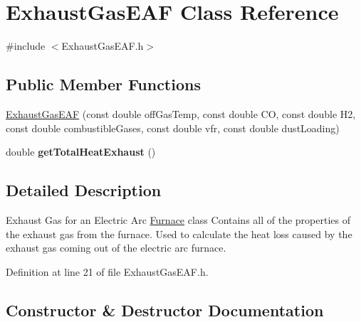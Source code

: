 \hypertarget{class_exhaust_gas_e_a_f}{}\section{Exhaust\+Gas\+E\+AF Class Reference}
\label{class_exhaust_gas_e_a_f}


{\ttfamily \#include $<$Exhaust\+Gas\+E\+A\+F.\+h$>$}

\subsection*{Public Member Functions}
\begin{DoxyCompactItemize}
\item 
\hyperlink{class_exhaust_gas_e_a_f_a500eba1e0016803cb94485594354f36a}{Exhaust\+Gas\+E\+AF} (const double off\+Gas\+Temp, const double CO, const double H2, const double combustible\+Gases, const double vfr, const double dust\+Loading)
\item 
\mbox{\label{class_exhaust_gas_e_a_f_a5f6442dab618e142b4ce43fcfb11d0cb}} 
double {\bfseries get\+Total\+Heat\+Exhaust} ()
\end{DoxyCompactItemize}


\subsection{Detailed Description}
Exhaust Gas for an Electric Arc \hyperlink{class_furnace}{Furnace} class Contains all of the properties of the exhaust gas from the furnace. Used to calculate the heat loss caused by the exhaust gas coming out of the electric arc furnace. 

Definition at line 21 of file Exhaust\+Gas\+E\+A\+F.\+h.



\subsection{Constructor \& Destructor Documentation}
\mbox{\label{class_exhaust_gas_e_a_f_a500eba1e0016803cb94485594354f36a}} 
